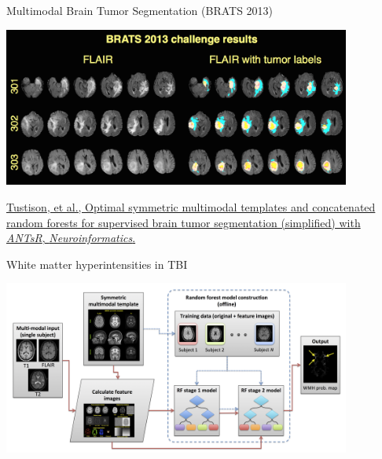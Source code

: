 \documentclass[ignorenonframetext,]{beamer}
\begin{document}
\begin{frame}{Multimodal Brain Tumor Segmentation (BRATS 2013)}

\begin{centering}

\includegraphics[width=4.5in]{./competitions/figures/brats2013results1.png}

\end{centering}

\small

\href{http://www.ncbi.nlm.nih.gov/pubmed/25433513}{Tustison, et al.,
Optimal symmetric multimodal templates and concatenated random forests
for supervised brain tumor segmentation (simplified) with \emph{ANTsR},
\emph{Neuroinformatics}.}

\end{frame}

\begin{frame}{White matter hyperintensities in TBI}

\begin{centering}

\includegraphics[width=4.5in]{./wmhs/figures/wmhPipeline.png}

\end{centering}

\end{frame}
\end{document}
